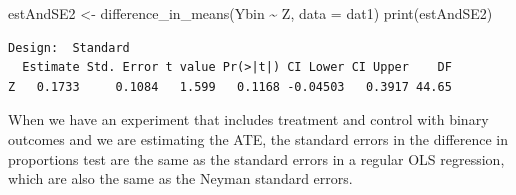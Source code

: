 \documentclass[
  12pt,
]{book}
\newenvironment{Shaded}{\begin{snugshade}}{\end{snugshade}}
\newcommand{\AttributeTok}[1]{\textcolor[rgb]{0.77,0.63,0.00}{#1}}
\newcommand{\CommentTok}[1]{\textcolor[rgb]{0.56,0.35,0.01}{\textit{#1}}}
\newcommand{\DecValTok}[1]{\textcolor[rgb]{0.00,0.00,0.81}{#1}}
\newcommand{\DocumentationTok}[1]{\textcolor[rgb]{0.56,0.35,0.01}{\textbf{\textit{#1}}}}
\newcommand{\FunctionTok}[1]{\textcolor[rgb]{0.00,0.00,0.00}{#1}}
\newcommand{\NormalTok}[1]{#1}
\newcommand{\OtherTok}[1]{\textcolor[rgb]{0.56,0.35,0.01}{#1}}
\newcommand{\SpecialCharTok}[1]{\textcolor[rgb]{0.00,0.00,0.00}{#1}}
\theoremstyle{definition}
\theoremstyle{definition}
\theoremstyle{definition}
\theoremstyle{remark}
\begin{document}
\begin{Shaded}
\end{Shaded}

\begin{Shaded}
\begin{Highlighting}[]
\NormalTok{estAndSE2 }\OtherTok{\textless{}{-}} \FunctionTok{difference\_in\_means}\NormalTok{(Ybin }\SpecialCharTok{\textasciitilde{}}\NormalTok{ Z, }\AttributeTok{data =}\NormalTok{ dat1)}
\FunctionTok{print}\NormalTok{(estAndSE2)}
\end{Highlighting}
\end{Shaded}

\begin{verbatim}
Design:  Standard 
  Estimate Std. Error t value Pr(>|t|) CI Lower CI Upper    DF
Z   0.1733     0.1084   1.599   0.1168 -0.04503   0.3917 44.65
\end{verbatim}

When we have an experiment that includes treatment and control with
binary outcomes and we are estimating the ATE, the standard errors in
the difference in proportions test are the same as the standard errors
in a regular OLS regression, which are also the same as the Neyman
standard errors.
\end{document}
